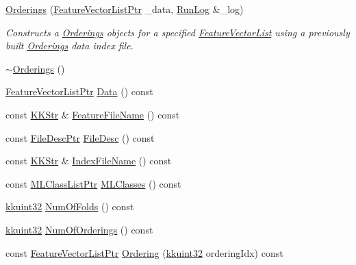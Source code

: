 \begin{DoxyCompactItemize}
\hyperlink{class_k_k_m_l_l_1_1_orderings_a1a43274845da3b8b90a7cc4940be06d7}{Orderings} (\hyperlink{namespace_k_k_m_l_l_acf2ba92a3cf03e2b19674b24ff488ef6}{Feature\+Vector\+List\+Ptr} \+\_\+data, \hyperlink{class_k_k_b_1_1_run_log}{Run\+Log} \&\+\_\+log)
\begin{DoxyCompactList}\small\item\em Constructs a \hyperlink{class_k_k_m_l_l_1_1_orderings}{Orderings} objects for a specified \hyperlink{class_k_k_m_l_l_1_1_feature_vector_list}{Feature\+Vector\+List} using a previously built \hyperlink{class_k_k_m_l_l_1_1_orderings}{Orderings} data index file. \end{DoxyCompactList}\item 
\hyperlink{class_k_k_m_l_l_1_1_orderings_ab0a1261c0e5dfe53f528d8121bf086bc}{$\sim$\+Orderings} ()
\item 
\hyperlink{namespace_k_k_m_l_l_acf2ba92a3cf03e2b19674b24ff488ef6}{Feature\+Vector\+List\+Ptr} \hyperlink{class_k_k_m_l_l_1_1_orderings_a80340f1c73fb14dddbbfbe166866aca8}{Data} () const 
\item 
const \hyperlink{class_k_k_b_1_1_k_k_str}{K\+K\+Str} \& \hyperlink{class_k_k_m_l_l_1_1_orderings_a6d0620cbf3553b81bd2687b3e5b41cd0}{Feature\+File\+Name} () const 
\item 
const \hyperlink{namespace_k_k_m_l_l_aa0d0b6ab4ec18868a399b8455b05d914}{File\+Desc\+Ptr} \hyperlink{class_k_k_m_l_l_1_1_orderings_ab8ae6f032f652b57f3b53a9372d132c6}{File\+Desc} () const 
\item 
const \hyperlink{class_k_k_b_1_1_k_k_str}{K\+K\+Str} \& \hyperlink{class_k_k_m_l_l_1_1_orderings_a2462c825cf06796f080ffad5840eea0c}{Index\+File\+Name} () const 
\item 
const \hyperlink{namespace_k_k_m_l_l_af091cde3f4a4315658b41a5e7583fc26}{M\+L\+Class\+List\+Ptr} \hyperlink{class_k_k_m_l_l_1_1_orderings_ae62368abdc7b7e28bbe7a9a175e659c4}{M\+L\+Classes} () const 
\item 
\hyperlink{namespace_k_k_b_af8d832f05c54994a1cce25bd5743e19a}{kkuint32} \hyperlink{class_k_k_m_l_l_1_1_orderings_a4529465ab113c39b45dd76c4a7705975}{Num\+Of\+Folds} () const 
\item 
\hyperlink{namespace_k_k_b_af8d832f05c54994a1cce25bd5743e19a}{kkuint32} \hyperlink{class_k_k_m_l_l_1_1_orderings_a41d0d0beb1a993a482d3bfc91de87e54}{Num\+Of\+Orderings} () const 
\item 
const \hyperlink{namespace_k_k_m_l_l_acf2ba92a3cf03e2b19674b24ff488ef6}{Feature\+Vector\+List\+Ptr} \hyperlink{class_k_k_m_l_l_1_1_orderings_a5c02baa64a2c46b638b1e2e7f93d23ff}{Ordering} (\hyperlink{namespace_k_k_b_af8d832f05c54994a1cce25bd5743e19a}{kkuint32} ordering\+Idx) const 

\end{DoxyCompactItemize}
